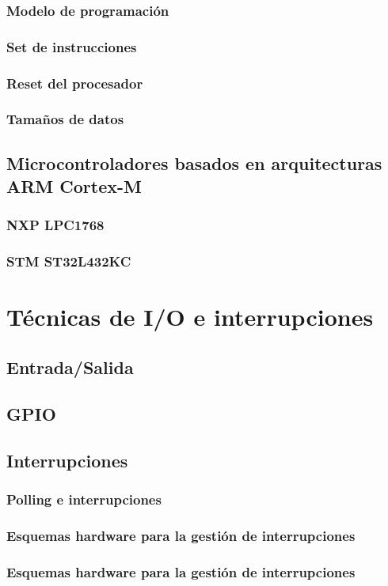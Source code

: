 \documentclass[a4paper]{book}
\numberwithin{figure}{chapter}
\numberwithin{equation}{chapter}
\begin{document}
\subsection{Modelo de programación}
\subsection{Set de instrucciones}
\subsection{Reset del procesador}
\subsection{Tamaños de datos}
\section{Microcontroladores basados en arquitecturas ARM Cortex-M}
\subsection{NXP LPC1768}
\subsection{STM ST32L432KC}

\chapter{Técnicas de I/O e interrupciones}
\section{Entrada/Salida}
\section{GPIO}
\section{Interrupciones}
\subsection{Polling e interrupciones}
\subsection{Esquemas hardware para la gestión de interrupciones}
\subsection{Esquemas hardware para la gestión de interrupciones}
\end{document}

